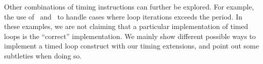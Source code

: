 Other combinations of timing instructions can further be explored.
For example, the use of \exceptiononexpire\ and \deactivateexception\ to handle cases where loop iterations exceeds the period.
In these examples, we are not claiming that a particular implementation of timed loops is the ``correct'' implementation.
We mainly show different possible ways to implement a timed loop construct with our timing extensions, and point out some subtleties when doing so.




